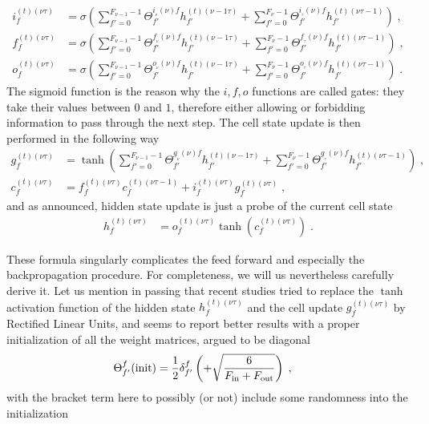\begin{align}
i^{(t)(\nu\tau)}_f&=\sigma\left(\sum_{f'=0}^{F_{{\nu-1}}-1}\Theta^{i_{_\nu}(\nu)f}_{f'}
%
h^{(t)(\nu-1\tau)}_{f'}+\sum_{f'=0}^{F{_{\nu}}-1}\Theta^{i_{_\tau}(\nu)f}_{f'}
%
h^{(t)(\nu\tau-1)}_{f'}\right)\;,\\
%
f^{(t)(\nu\tau)}_f&=\sigma\left(\sum_{f'=0}^{F{_{\nu-1}}-1}\Theta^{f_{_\nu}(\nu)f}_{f'}
%
h^{(t)(\nu-1\tau)}_{f'}+\sum_{f'=0}^{F_{{\nu}}-1}\Theta^{f_{_\tau}(\nu)f}_{f'}
%
h^{(t)(\nu\tau-1)}_{f'}\right)\;,\\
%
o^{(t)(\nu\tau)}_f&=\sigma\left(\sum_{f'=0}^{F_{{\nu-1}}-1}\Theta^{o_{_\nu}(\nu)f}_{f'}
%
h^{(t)(\nu-1\tau)}_{f'}+\sum_{f'=0}^{F_{{\nu}}-1}\Theta^{o_{_\tau}(\nu)f}_{f'}
%
h^{(t)(\nu\tau-1)}_{f'}\right)\;.
\end{align}
The sigmoid function is the reason why the $i,f,o$ functions are called gates: they take their values between $0$ and $1$, therefore either allowing or forbidding information to pass through the next step. The cell state update is then performed in the following way
\begin{align}
g^{(t)(\nu\tau)}_f&=\tanh\left(\sum_{f'=0}^{F_{{\nu-1}}-1}\Theta^{g_{_\nu}(\nu)f}_{f'}
%
h^{(t)(\nu-1\tau)}_{f'}+\sum_{f'=0}^{F_{{\nu}}-1}\Theta^{g_{_\tau}(\nu)f}_{f'}
%
h^{(t)(\nu\tau-1)}_{f'}\right)\;,\\
%
c^{(t)(\nu\tau)}_{f}&=
%
f^{(t)(\nu\tau)}_{f}c^{(t)(\nu\tau-1)}_{f}+i^{(t)(\nu\tau)}_{f}g^{(t)(\nu\tau)}_{f}\;,
\end{align}
and as announced, hidden state update is just a probe of the current cell state
\begin{align}
h^{(t)(\nu\tau)}_{f}&=o^{(t)(\nu\tau)}_{f}\tanh \left(c^{(t)(\nu\tau)}_{f}\right)\;.
\end{align}

These formula singularly complicates the feed forward and especially the backpropagation procedure. For completeness, we will us nevertheless carefully derive it. Let us mention in passing that recent studies tried to replace the $\tanh$ activation function of the hidden state $h^{(t)(\nu\tau)}_{f}$ and the cell update $g^{(t)(\nu\tau)}_f$ by Rectified Linear Units, and seems to report better results with a proper initialization of all the weight matrices, argued to be diagonal
\begin{align}
\Theta^f_{f'}(\text{init})&=\frac12\delta^f_{f'}\left(+\sqrt{\frac{6}{F_{\rm in}+F_{\rm out}}}\right)\;,
\end{align}
with the bracket term here to possibly (or not) include some randomness into the initialization

